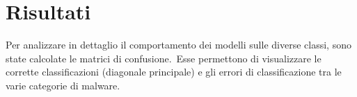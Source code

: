 \section{Risultati}

Per analizzare in dettaglio il comportamento dei modelli sulle diverse classi, sono state calcolate le matrici di confusione.\
Esse permettono di visualizzare le corrette classificazioni (diagonale principale) e gli errori di classificazione tra le varie categorie di malware.